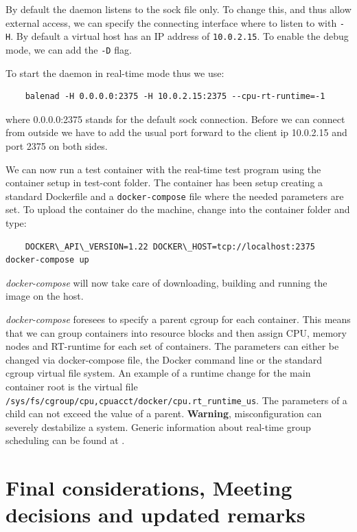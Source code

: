 \documentclass[]{scrartcl}
\begin{document}
By default the daemon listens to the sock file only. To change this, and thus allow external access, we can specify the connecting interface where to listen to with \texttt{-H}. By default a virtual host has an IP address of \texttt{10.0.2.15}. To enable the debug mode, we can add the \texttt{-D} flag.

To start the daemon in real-time mode thus we use:

\begin{verbatim}
	balenad -H 0.0.0.0:2375 -H 10.0.2.15:2375 --cpu-rt-runtime=-1
\end{verbatim}

where 0.0.0.0:2375 stands for the default sock connection. Before we can connect from outside we have to add the usual port forward to the client ip 10.0.2.15 and port 2375 on both sides.

We can now run a test container with the real-time test program using the container setup in test-cont folder. The container has been setup creating a standard Dockerfile and a \texttt{docker-compose} file where the needed parameters are set. To upload the container do the machine, change into the container folder and type:

\begin{verbatim}
	DOCKER\_API\_VERSION=1.22 DOCKER\_HOST=tcp://localhost:2375 docker-compose up
\end{verbatim}

\textit{docker-compose} will now take care of downloading, building and running the image on the host.

\textit{docker-compose} foresees to specify a parent cgroup for each container. This means that we can group containers into resource blocks and then assign CPU, memory nodes and RT-runtime for each set of containers. The parameters can either be changed via docker-compose file, the Docker command line or the standard cgroup virtual file system. An example of a runtime change for the main container root is the virtual file \texttt{/sys/fs/cgroup/cpu,cpuacct/docker/cpu.rt\_runtime\_us}. The parameters of a child can not exceed the value of a parent. \textbf{Warning}, misconfiguration can severely destabilize a system. Generic information about real-time group scheduling can be found at \cite{kernel01}.

\section{Final considerations, Meeting decisions and updated remarks}
\end{document}
